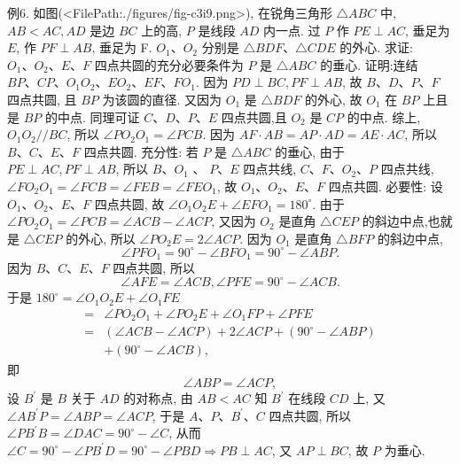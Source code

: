 例6. 如图(<FilePath:./figures/fig-c3i9.png>), 在锐角三角形 $\triangle A B C$ 中, $A B<A C, A D$ 是边 $B C$ 上的高, $P$ 是线段 $A D$ 内一点.
过 $P$ 作 $P E \perp A C$, 垂足为 $E$, 作 $P F \perp A B$, 垂足为 F. $O_1 、 O_2$ 分别是 $\triangle B D F 、 \triangle C D E$ 的外心.
求证: $O_1 、 O_2 、 E 、 F$ 四点共圆的充分必要条件为 $P$ 是 $\triangle A B C$ 的垂心.
证明:连结 $B P 、 C P 、 O_1 O_2 、 E O_2 、 E F 、 F O_1$.
因为 $P D \perp B C, P F \perp A B$, 故 $B 、 D 、 P 、 F$ 四点共圆, 且 $B P$ 为该圆的直径.
又因为 $O_1$ 是 $\triangle B D F$ 的外心, 故 $O_1$ 在 $B P$ 上且是 $B P$ 的中点.
同理可证 $C 、 D 、 P 、 E$ 四点共圆,且 $O_2$ 是 $C P$ 的中点.
综上, $O_1 O_2 / / B C$, 所以 $\angle P O_2 O_1=\angle P C B$.
因为 $A F \cdot A B=A P \cdot A D=A E \cdot A C$, 所以 $B 、 C 、 E 、 F$ 四点共圆.
充分性: 若 $P$ 是 $\triangle A B C$ 的垂心, 由于 $P E \perp A C, P F \perp A B$, 所以 $B 、 O_1$ 、 $P 、 E$ 四点共线, $C 、 F 、 O_2 、 P$ 四点共线, $\angle F O_2 O_1=\angle F C B=\angle F E B= \angle F E O_1$, 故 $O_1 、 O_2 、 E 、 F$ 四点共圆.
必要性: 设 $O_1 、 O_2 、 E 、 F$ 四点共圆, 故 $\angle O_1 O_2 E+\angle E F O_1=180^{\circ}$. 由于 $\angle P O_2 O_1=\angle P C B=\angle A C B-\angle A C P$, 又因为 $O_2$ 是直角 $\triangle C E P$ 的斜边中点,也就是 $\triangle C E P$ 的外心, 所以 $\angle P O_2 E=2 \angle A C P$.
因为 $O_1$ 是直角 $\triangle B F P$ 的斜边中点,
$$
\angle P F O_1=90^{\circ}-\angle B F O_1=90^{\circ}-\angle A B P .
$$
因为 $B 、 C 、 E 、 F$ 四点共圆, 所以
$$
\angle A F E=\angle A C B, \angle P F E=90^{\circ}-\angle A C B .
$$
于是 $180^{\circ}=\angle O_1 O_2 E+\angle O_1 F E$
$$
\begin{aligned}
= & \angle P O_2 O_1+\angle P O_2 E+\angle O_1 F P+\angle P F E \\
= & (\angle A C B-\angle A C P)+2 \angle A C P+\left(90^{\circ}-\angle A B P\right) \\
& +\left(90^{\circ}-\angle A C B\right),
\end{aligned}
$$
即
$$
\angle A B P=\angle A C P,
$$
设 $B^{\prime}$ 是 $B$ 关于 $A D$ 的对称点, 由 $A B<A C$ 知 $B^{\prime}$ 在线段 $C D$ 上, 又 $\angle A B^{\prime} P= \angle A B P=\angle A C P$, 于是 $A 、 P 、 B^{\prime} 、 C$ 四点共圆, 所以 $\angle P B^{\prime} B=\angle D A C= 90^{\circ}-\angle C$, 从而 $\angle C=90^{\circ}-\angle P B^{\prime} D=90^{\circ}-\angle P B D \Rightarrow P B \perp A C$, 又 $A P \perp B C$, 故 $P$ 为垂心.



